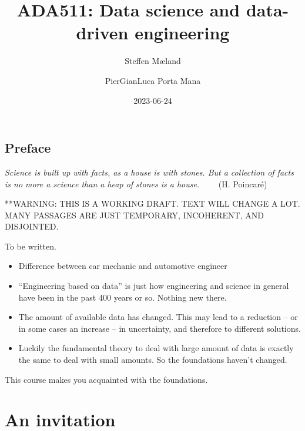 \documentclass[
  a4paper,
  DIV=11,
  numbers=noendperiod,
  oneside]{scrreprt}
\title{ADA511: Data science and data-driven engineering}
\author{Steffen Mæland \and PierGianLuca Porta Mana}
\date{2023-06-24}
\renewcommand*\contentsname{Table of contents}
\newcommand\contentsname{Table of contents}
\begin{document}
\maketitle
\ifdefined\Shaded\renewenvironment{Shaded}{\begin{tcolorbox}[breakable, frame hidden, interior hidden, boxrule=0pt, sharp corners, borderline west={3pt}{0pt}{shadecolor}, enhanced]}{\end{tcolorbox}}\fi

\renewcommand*\contentsname{Table of contents}
{
\hypersetup{linkcolor=}
\setcounter{tocdepth}{2}
\tableofcontents
}

\hypertarget{preface}{%
\chapter*{Preface}\label{preface}}


\hfill\break
\hfill\break
\hfill\break
\hfill\break
\hfill\break
\hfill\break

\emph{Science is built up with facts, as a house is with stones. But a
collection of facts is no more a science than a heap of stones is a
house.} ~~~~{(H. Poincaré)}

**WARNING: THIS IS A WORKING DRAFT. TEXT WILL CHANGE A LOT. MANY
PASSAGES ARE JUST TEMPORARY, INCOHERENT, AND DISJOINTED.

To be written.

\begin{itemize}
\item
  Difference between car mechanic and automotive engineer
\item
  ``Engineering based on data'' is just how engineering and science in
  general have been in the past 400 years or so. Nothing new there.
\item
  The amount of available data has changed. This may lead to a reduction
  -- or in some cases an increase -- in uncertainty, and therefore to
  different solutions.
\item
  Luckily the fundamental theory to deal with large amount of data is
  exactly the same to deal with small amounts. So the foundations
  haven't changed.
\end{itemize}

This course makes you acquainted with the foundations.

\part{An invitation}
\end{document}
